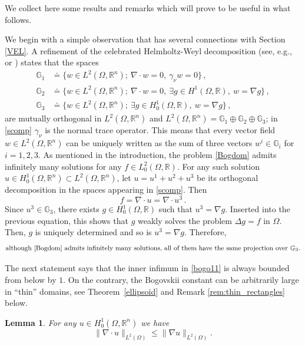 \documentclass[11pt]{article}
\theoremstyle{plain}
\newtheorem{lemma}[theorem]{Lemma}
\theoremstyle{definition}
\numberwithin{equation}{section}
\newcommand{\R}{\mathbb{R}}
\begin{document}
We collect here some results and remarks which will prove to be useful in what follows.\par
We begin with a simple observation that has several connections with Section \ref{VEL}.
A refinement of the celebrated Helmholtz-Weyl decomposition (see, e.g., \cite[Theorem I.1.5]{temam} or \cite[Theorem~III.1.1]{galdi2011introduction}) states that the spaces
\begin{align}
\mathbb{G}_1 &\doteq \{w\in L^2(\Omega,\R^n);\ \nabla\cdot w=0,\ \gamma_\nu w=0\}\, ,\\
\mathbb{G}_2 &\doteq \{w\in L^2(\Omega,\R^n);\ \nabla\cdot w=0,\ \exists g\in H^1(\Omega,\R),\ w=\nabla g\}\, , \label{scomp}\\
\mathbb{G}_3 &\doteq \{w\in L^2(\Omega,\R^n);\ \exists g\in H^1_0(\Omega,\R),\ w=\nabla g\}\, ,
\end{align}
are mutually orthogonal in $L^2(\Omega,\R^n)$ and $L^2(\Omega,\R^n)=\mathbb{G}_1\oplus\mathbb{G}_2\oplus\mathbb{G}_3$;
in \eqref{scomp} $\gamma_\nu$ is the normal trace operator.
This means that every vector field $w\in L^2(\Omega,\R^n)$ can be uniquely written as the sum of three vectors $w^i\in\mathbb{G}_i$ for $i=1,2,3$.
As mentioned in the introduction, the problem \eqref{Bogdom} admits infinitely many solutions for any $f\in L^2_0(\Omega,\R)$.
For any such solution $u\in H^1_0(\Omega,\R^n)\subset L^2(\Omega,\R^n)$, let $u=u^1+u^2+u^3$ be its orthogonal decomposition in the spaces appearing in \eqref{scomp}. Then
$$f=\nabla\cdot u=\nabla\cdot u^3\, .$$
Since $u^3\in\mathbb{G}_3$, there exists $g\in H^1_0(\Omega,\R)$ such that $u^3=\nabla g$. Inserted into the previous equation,
this shows that $g$ weakly solves the problem $\Delta g=f$ in $\Omega$.
Then, $g$ is uniquely determined and so is $u^3=\nabla g$. Therefore,
\begin{equation}\label{G3}
\mbox{although \eqref{Bogdom} admits infinitely many solutions, all of them have the same projection over $\mathbb{G}_3$.}
\end{equation}

The next statement says that the inner infimum in \eqref{bogo11} is always bounded from below by $1$. On the contrary, the Bogovskii constant can be arbitrarily large
in ``thin'' domains, see Theorem~\ref{ellipsoid} and Remark \ref{rem:thin_rectangles} below.

\begin{lemma}\label{lem:general_lower_bound}
For any $u\in H^1_0(\Omega, \mathbb{R}^{n})$ we have
	\begin{equation}\label{lowBog}
	\| \nabla \cdot u\|_{L^2(\Omega )}\le \| \nabla u\|_{L^2(\Omega )}.
	\end{equation}
\end{lemma}
\end{document}
